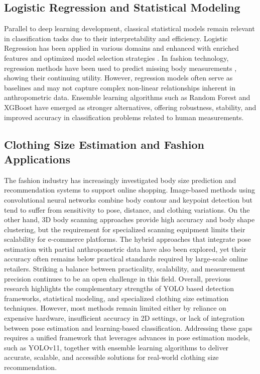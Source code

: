 \documentclass{llncs}
\begin{document}
\subsection{Logistic Regression and Statistical Modeling}

Parallel to deep learning development, classical statistical models remain relevant in classification tasks due to their interpretability and efficiency. 
Logistic Regression has been applied in various domains and enhanced with enriched features \cite{ref7} and optimized model selection strategies \cite{ref8}. 
In fashion technology, regression methods have been used to predict missing body measurements \cite{ref9}, showing their continuing utility. 
However, regression models often serve as baselines and may not capture complex non-linear relationships inherent in anthropometric data. 
Ensemble learning algorithms such as Random Forest and XGBoost have emerged as stronger alternatives, offering robustness, stability, and improved accuracy in classification problems related to human measurements.
\subsection{Clothing Size Estimation and Fashion Applications}

The fashion industry has increasingly investigated body size prediction and recommendation systems to support online shopping. 
Image-based methods using convolutional neural networks \cite{ref10} combine body contour and keypoint detection but tend to suffer from sensitivity to pose, distance, and clothing variations. 
On the other hand, 3D body scanning approaches \cite{ref11} provide high accuracy and body shape clustering, but the requirement for specialized scanning equipment limits their scalability for e-commerce platforms. 
The hybrid approaches that integrate pose estimation with partial anthropometric data have also been explored, yet their accuracy often remains below practical standards required by large-scale online retailers. 
Striking a balance between practicality, scalability, and measurement precision continues to be an open challenge in this field.
Overall, previous research highlights the complementary strengths of YOLO based detection frameworks, statistical modeling, and specialized clothing size estimation techniques. 
However, most methods remain limited either by reliance on expensive hardware, insufficient accuracy in 2D settings, or lack of integration between pose estimation and learning-based classification. 
Addressing these gaps requires a unified framework that leverages advances in pose estimation models, such as YOLOv11, together with ensemble learning algorithms to deliver accurate, scalable, and accessible solutions for real-world clothing size recommendation.
\end{document}
